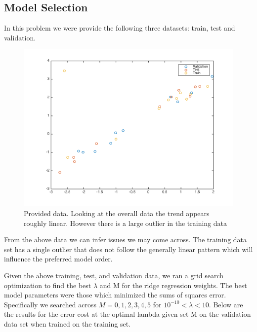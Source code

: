 \documentclass[10pt,twocolumn]{article}
\begin{document}
\subsection*{ Model Selection}
In this problem we were provide the following three datasets: train, test and validation. 
\begin{figure}[H]
\center
\includegraphics[scale =.4]{test_train_validate.png}
\caption{Provided data. Looking at the overall data the trend appears roughly linear. However there is a large outlier in the training data}
\end{figure}

From the above data we can infer issues we may come across. The training data set has a single outlier that does not follow the generally linear pattern which will influence the preferred model order. 

Given the above training, test, and validation data, we ran a grid search optimization to find the best $\lambda$ and M for the ridge regression weights. The best model parameters were those which minimized the sums of squares error. Specifically we searched across $M= {0,1,2,3,4,5}$  for $10^{-10} < \lambda <10 $. Below are the results for the error cost at the optimal lambda given set M on the validation data set when trained on the training set. 
\end{document}
